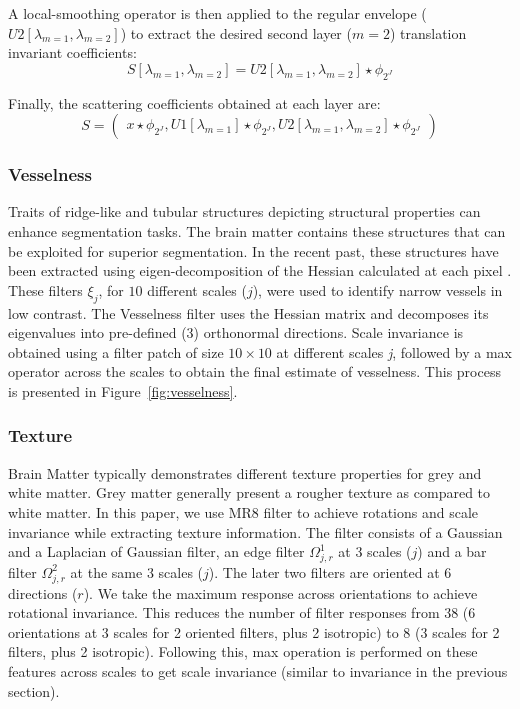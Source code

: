 \documentclass[10pt,twocolumn,letterpaper]{article}
\begin{document}
A local-smoothing operator is then applied to the regular envelope 
($U2[\lambda_{m = 1},\lambda_{m = 2}]$) to extract the desired second layer ($m = 2$) translation invariant coefficients: 
\begin{equation}
S[\lambda_{m = 1},\lambda_{m = 2}] = U2[\lambda_{m = 1},\lambda_{m = 2}] \star \phi_{2^J}
\end{equation}

Finally, the scattering coefficients obtained at each layer are:
\begin{equation}
S = \begin{pmatrix}
x \star \phi_{2^J},
U1[\lambda_{m = 1}] \star \phi_{2^J},
U2[\lambda_{m = 1},\lambda_{m = 2}] \star \phi_{2^J}
\end{pmatrix}
\end{equation} 
\subsubsection{Vesselness}
Traits of ridge-like and tubular structures depicting structural properties can enhance segmentation tasks. The brain matter contains these structures that can be exploited for superior segmentation. In the recent past, these structures have been extracted using eigen-decomposition of the Hessian calculated at each pixel \cite{aylward2002initialization,lindeberg1998edge}. These filters $\xi_j$, for $10$ different scales ($j$), were used to identify narrow vessels in low contrast. The Vesselness filter uses the Hessian matrix and decomposes its eigenvalues into pre-defined (3) orthonormal directions. Scale invariance is obtained using a filter patch of size $10 \times 10$ at different scales \textit{j}, followed by a max operator across the scales to obtain the final estimate of vesselness. This process is presented in Figure~\ref{fig:vesselness}.

\subsubsection{Texture}
Brain Matter typically demonstrates different texture properties for grey and white matter. Grey matter generally present a rougher texture as compared to white matter. In this paper, we use MR8 filter \cite{pitiot2004expert} to achieve rotations and scale invariance while extracting texture information. The filter consists of a Gaussian and a Laplacian of Gaussian filter, an edge filter $\Omega_{j,r}^1$ at 3 scales ($j$) and a bar filter $\Omega_{j,r}^2$ at the same 3 scales ($j$). The later two filters are oriented at 6 directions ($r$). We take the maximum response across orientations to achieve rotational invariance. This reduces the number of filter responses from 38 (6 orientations at 3 scales for 2 oriented filters, plus 2 isotropic) to 8 (3 scales for 2 filters, plus 2 isotropic). Following this, max operation is performed on these features across scales to get scale invariance (similar to invariance in the previous section).
\end{document}
